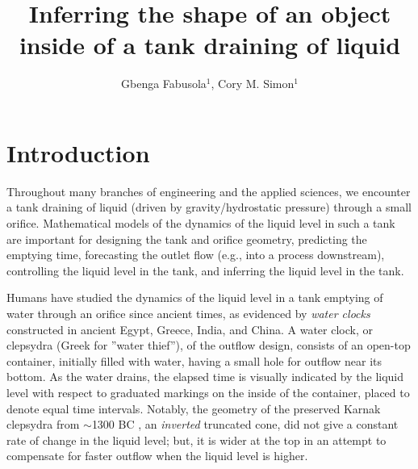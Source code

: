 \documentclass[openacc]{rsproca_new}%
\begin{document}
\title{Inferring the shape of an object inside of a tank draining of liquid}

\author{%
Gbenga Fabusola$^{1}$, 
Cory M. Simon$^{1}$
}

\address{$^{1}$School of Chemical, Biological, and Environmental Engineering. Oregon State University. Corvallis, OR, USA.
}

\subject{applied mathematics, chemical engineering}



\begin{abstract}

\absbreak %
\end{abstract}

\rsbreak


\section{Introduction}
Throughout many branches of engineering and the applied sciences, we encounter a tank draining of liquid (driven by gravity/hydrostatic pressure) through a small orifice. 
Mathematical models of the dynamics of the liquid level in such a tank are important for designing the tank and orifice geometry, predicting the emptying time, forecasting the outlet flow (e.g., into a process downstream), controlling the liquid level in the tank, and inferring the liquid level in the tank.

Humans have studied the dynamics of the liquid level in a tank emptying of water through an orifice since ancient times, as evidenced by \emph{water clocks} constructed in ancient Egypt, Greece, India, and China. A water clock, or clepsydra (Greek for ''water thief''), of the outflow design, consists of an open-top container, initially filled with water, having a small hole for outflow near its bottom. As the water drains, the elapsed time is visually indicated by the liquid level with respect to graduated markings on the inside of the container, placed to denote equal time intervals. 
\cite{bedini1962compartmented,hwang2021historical,ritner2016oriental,hejun1987research,schomberg2018karnak,mills1982newton}
Notably, the geometry of the preserved Karnak clepsydra from $\sim$1300 BC \cite{schomberg2018karnak}, an \emph{inverted} truncated cone, did not give a constant rate of change in the liquid level; but, it is wider at the top in an attempt to compensate for faster outflow when the liquid level is higher.
\end{document}
